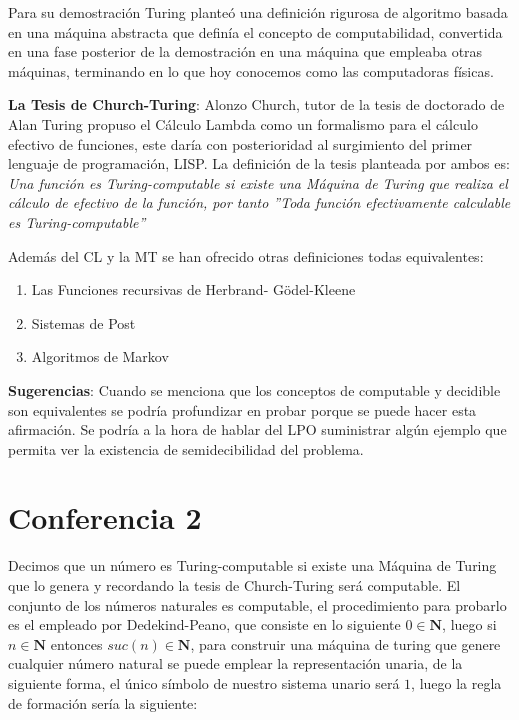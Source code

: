 \documentclass[]{article}
\begin{document}
Para su demostración Turing planteó una definición rigurosa de algoritmo basada en una máquina abstracta que definía el concepto de computabilidad, convertida en una fase posterior de la demostración en una máquina que empleaba otras máquinas, terminando en lo que hoy conocemos como las computadoras físicas.

\textbf{La Tesis de Church-Turing}: Alonzo Church, tutor de la tesis de doctorado de Alan Turing propuso el Cálculo Lambda como un formalismo para el cálculo efectivo de funciones, este daría con posterioridad al surgimiento del primer lenguaje de programación, LISP. La definición de la tesis planteada por ambos es: \textit{Una función es Turing-computable si existe una Máquina de Turing que realiza el cálculo de efectivo de la función, por tanto ''Toda función efectivamente calculable es Turing-computable''}

Además del CL y la MT se han ofrecido otras definiciones todas equivalentes:
\begin{enumerate}
	\item Las Funciones recursivas de Herbrand- Gödel-Kleene 
	\item Sistemas de Post  
	\item Algoritmos de Markov
\end{enumerate}

\textbf{Sugerencias}: Cuando se menciona que los conceptos de computable y decidible son equivalentes se podría profundizar en probar porque se puede hacer esta afirmación. Se podría a la hora de hablar del LPO suministrar algún ejemplo que permita ver la existencia de semidecibilidad del problema.


\section*{Conferencia 2}

Decimos que un número es Turing-computable si existe una Máquina de Turing que lo genera y recordando la tesis de Church-Turing será computable. El conjunto de los números naturales es computable, el procedimiento para probarlo es el empleado por Dedekind-Peano, que consiste en lo siguiente $0 \in \textbf{N}$, luego si $n \in \textbf{N}$ entonces $suc(n) \in \textbf{N}$, para construir una máquina de turing que genere cualquier número natural se puede emplear la representación unaria, de la siguiente forma, el único símbolo de nuestro sistema unario será $1$, luego la regla de formación sería la siguiente:
\end{document}
